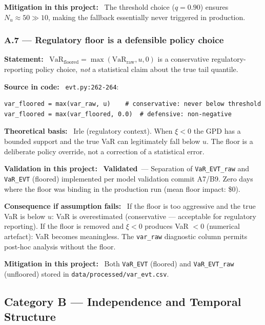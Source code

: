 \documentclass[11pt,a4paper]{article}
\newcommand{\asmfield}[1]{\medskip\noindent\textbf{#1:}\ }
\newcommand{\code}[1]{\texttt{#1}}
\newcommand{\validated}{\textbf{Validated}}
\begin{document}
\asmfield{Mitigation in this project}
The threshold choice ($q = 0.90$) ensures $N_u \approx 50 \gg 10$,
making the fallback essentially never triggered in production.

\subsubsection{A.7 --- Regulatory floor is a defensible policy choice}\label{asm:A7}

\asmfield{Statement}
$\text{VaR}_{\text{floored}} = \max(\text{VaR}_{\text{raw}}, u, 0)$ is a
conservative regulatory-reporting policy choice, \emph{not} a statistical
claim about the true tail quantile.

\asmfield{Source in code}
\code{evt.py:262-264}:
\begin{lstlisting}
var_floored = max(var_raw, u)    # conservative: never below threshold
var_floored = max(var_floored, 0.0)  # defensive: non-negative
\end{lstlisting}

\asmfield{Theoretical basis}
Irle (regulatory context). When $\xi < 0$ the GPD has a bounded support
and the true VaR can legitimately fall below $u$. The floor is a
deliberate policy override, not a correction of a statistical error.

\asmfield{Validation in this project}
\validated\ --- Separation of \code{VaR\_EVT\_raw} and \code{VaR\_EVT}
(floored) implemented per model validation commit A7/B9. Zero days where
the floor was binding in the production run (mean floor impact: \$0).

\asmfield{Consequence if assumption fails}
If the floor is too aggressive and the true VaR is below $u$: VaR is
overestimated (conservative --- acceptable for regulatory reporting). If
the floor is removed and $\xi < 0$ produces VaR $< 0$ (numerical artefact):
VaR becomes meaningless. The \code{var\_raw} diagnostic column permits
post-hoc analysis without the floor.

\asmfield{Mitigation in this project}
Both \code{VaR\_EVT} (floored) and \code{VaR\_EVT\_raw} (unfloored)
stored in \code{data/processed/var\_evt.csv}.

\subsection{Category B --- Independence and Temporal Structure}\label{sec:catB}
\end{document}
